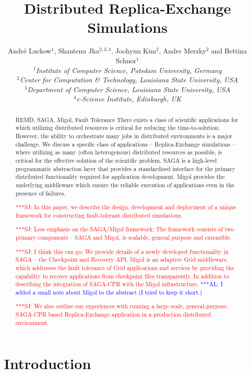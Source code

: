 \documentclass{rspublic}
\title[Distributed Replica-Exchange Simulations]{Distributed
  Replica-Exchange Simulations}
\author[Luckow, Jha, Kim, Merzky, Schnor]{
  Andr\'e Luckow$^{1}$, Shantenu Jha$^{2,3,4}$, Joohyun Kim$^{2}$, Andre Merzky$^{2}$ and Bettina Schnor$^{1}$\\
  \small{\emph{$^{1}$Institute of Computer Science, Potsdam University, Germany}}\\
  \small{\emph{$^{2}$Center for Computation \& Technology, Louisiana State University, USA}}\\
  \small{\emph{$^{3}$Department of Computer Science, Louisiana State
      University, USA}}\\
  \small{\emph{$^{4}$e-Science Institute, Edinburgh, UK}}\\
}
\newcommand{\alnote}[1]{ {\textcolor{blue} { ***AL: #1 }}}
\newcommand{\jhanote}[1]{ {\textcolor{red} { ***SJ: #1 }}}
\newcommand{\alnote}[1]{}
\newcommand{\jhanote}[1]{}
\begin{document}
 


\maketitle    

\begin{abstract}{REMD, SAGA, Migol, Fault Tolerance}  
  There exists a class of scientific applications for which utilizing
  distributed resources is critical for reducing the
  time-to-solution. However, the ability to orchestrate many
  jobs in distributed environments is a major challenge.
  We discuss a specific class of applications -- Replica-Exchange
  simulations -- where utilizing as many (often heterogenous)
  distributed resources as possible, is critical for the effective
  solution of the scientific problem.  
  SAGA is a high-level
  programmatic abstraction layer that provides a standardised
  interface for the primary distributed functionality required for
  application development. Migol provides the underlying middleware
  which ensure the reliable execution of applications even in
  the presence of failures.

  \jhanote{In this paper, we describe the design, development and
    deployment of a unique framework for constructing fault-tolerant
    distributed simulations.}

  \jhanote{Less emphasis on the SAGA/Migol framework: The framework
    consists of two primary components -- SAGA and Migol, is scalable,
    general purpose and extensible.}

  \jhanote{I think this can go: We provide details of a newly
    developed functionality in SAGA -- the Checkpoint and Recovery
    API. Migol is an adaptive Grid middleware, which addresses the
    fault tolerance of Grid applications and services by providing the
    capability to recover applications from checkpoint files
    transparently.  In addition to describing the integration of
    SAGA-CPR with the Migol infrastructure,}
  \alnote{I added a small note about Migol to the abstract (I tried to keep
    it short.)}

  \jhanote{We also outline our experiences with running a large scale,
    general-purpose, SAGA-CPR based Replica-Exchange application in a
    production distributed environment.}

\end{abstract}

\section{Introduction}
\end{document}
